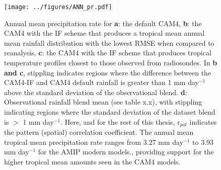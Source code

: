 \documentclass[letterpaper,12pt,titlepage,oneside,final]{book}
\begin{document}
\begin{figure}[H]
\centering
\noindent\texttt{[image: ../figures/ANN\_pr.pdf]}\hfill
\caption{Annual mean precipitation rate for \textbf{a}: the default CAM4, \textbf{b}: the CAM4 with the IF scheme that produces a tropical mean annual mean rainfall distribution with the lowest RMSE when compared to reanalysis, \textbf{c}: the CAM4 with the IF scheme that produces tropical temperature profiles closest to those observed from radiosondes. In \textbf{b and c}, stippling indicates regions where the difference between the CAM4-IF and CAM4 default rainfall is greater than 1 mm day$^{-1}$ above the standard deviation of the observational blend. \textbf{d}: Observational rainfall blend mean (see table x.x), with stippling indicating regions where the standard deviation of the dataset blend is $>$ 1 mm day$^{-1}$. Here, and for the rest of this thesis, r$_{pat}$ indicates the pattern (spatial) correlation coefficient. The annual mean tropical mean precipitation rate ranges from 3.27 mm day$^{-1}$ to 3.93 mm day$^{-1}$  for the AMIP modern models., providing support for the higher tropical mean amounts seen in the CAM4 models.}
\label{fig:3.1}
\end{figure}
\end{document}
